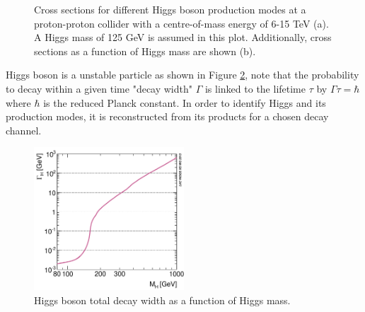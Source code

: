 \begin{figure}[ht]
    \centering
    \caption{Cross sections for different Higgs boson production modes at a proton-proton collider with a centre-of-mass energy of 6-15 TeV (a). A Higgs mass of 125 GeV is assumed in this plot. Additionally, cross sections as a function of Higgs mass are shown (b).}
    \label{fig:chap1:EWSB:HXSEC}
\end{figure}

Higgs boson is a unstable particle as shown in Figure \ref{fig:chap1:EWSB:D}, note that the probability to decay within a given time "decay width" $\Gamma$ is linked to the lifetime $\tau$ by $ \Gamma\tau = \hbar$ where $\hbar$ is the reduced Planck constant. In order to identify Higgs and its production modes, it is reconstructed from its products for a chosen decay channel. 
\begin{figure}[ht]
    \centering
    \includegraphics[width=0.5\textwidth]{Ch1/Img/Higgs_decay.png}
    \caption{Higgs boson total decay width as a function of Higgs mass.}
    \label{fig:chap1:EWSB:D}
\end{figure}

